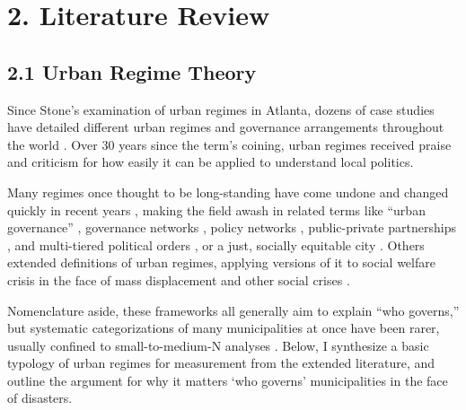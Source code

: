 \documentclass[preprint, 3p,
authoryear]{elsarticle} %
\begin{document}
\hypertarget{literature-review}{%
\section{2. Literature Review}\label{literature-review}}

\hypertarget{urban-regime-theory}{%
\subsection{2.1 Urban Regime Theory}\label{urban-regime-theory}}

Since Stone's \citeyearpar{stone_1989} examination of urban regimes in
Atlanta, dozens of case studies have detailed different urban regimes
and governance arrangements throughout the world
\citep{stoker_and_mossberger_1994, mossberger_and_stoker_2001, de_socio_2007, camou_2014, davies_and_blanco_2017, rosol_et_al_2017, russo_and_scarnato_2018}.
Over 30 years since the term's coining, urban regimes received praise
\citep{kilburn_2004, davies_and_imbroscio_2009} and criticism
\citep{sites_1997, davies_2003, imbroscio_2003, imbroscio_2004} for how
easily it can be applied to understand local politics.

Many regimes once thought to be long-standing have come undone and
changed quickly in recent years \citep{stone_2015, stone_et_al_2015},
making the field awash in related terms like ``urban governance''
\citep{pierre_2014, da_cruz_et_al_2019}, governance networks
\citep{gissendanner_2003, davidson_et_al_2019}, policy networks
\citep{bulkeley_and_betsill_2013, hawkins_et_al_2016, wukich_2022},
public-private partnerships
\citep{stoker_1998, davies_2017, guo_and_ho_2019}, and multi-tiered
political orders \citep{stone_2015, weaver_2022}, or a just, socially
equitable city \citep{campbell_1996, fainstein_2010}. Others extended
definitions of urban regimes, applying versions of it to social welfare
crisis in the face of mass displacement and other social crises
\citep{lambelet_2019}.

Nomenclature aside, these frameworks all generally aim to explain ``who
governs,'' but systematic categorizations of many municipalities at once
have been rarer, usually confined to small-to-medium-N analyses
\citep{sellers_2002, kilburn_2004, stone_et_al_2015, davies_and_blanco_2017}.
Below, I synthesize a basic typology of urban regimes for measurement
from the extended literature, and outline the argument for why it
matters `who governs' municipalities in the face of disasters.
\end{document}
